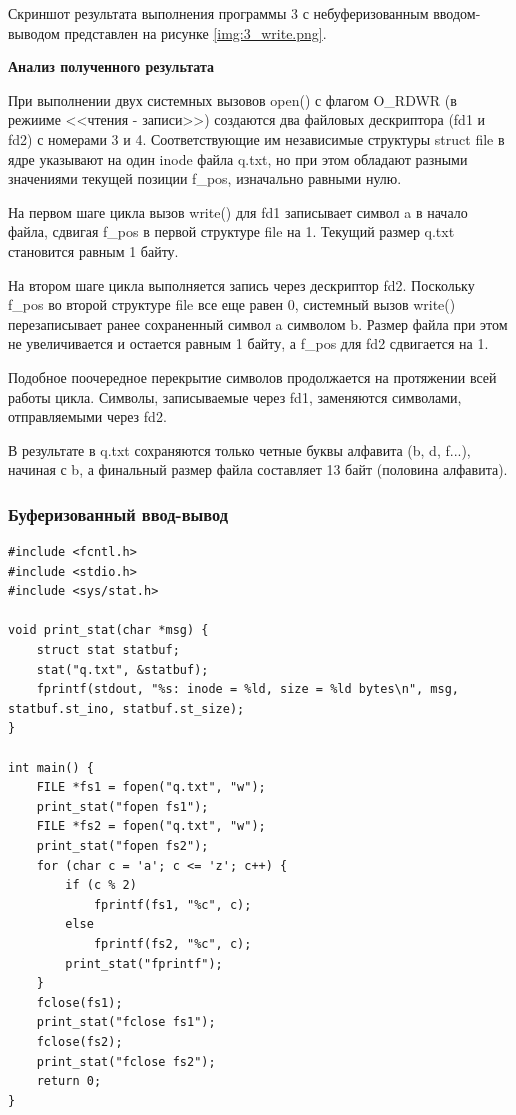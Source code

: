 Скриншот результата выполнения программы 3 с небуферизованным вводом-выводом представлен на рисунке \ref{img:3_write.png}.

\clearpage

\textbf{Анализ полученного результата}

При выполнении двух системных вызовов open() с флагом O\_RDWR (в режииме <<чтения - записи>>) создаются два файловых дескриптора (fd1 и fd2) с номерами 3 и 4. Соответствующие им независимые структуры struct file в ядре указывают на один inode файла q.txt, но при этом обладают разными значениями текущей позиции f\_pos, изначально равными нулю.

На первом шаге цикла вызов write() для fd1 записывает символ a в начало файла, сдвигая f\_pos в первой структуре file на 1. Текущий размер q.txt становится равным 1 байту.

На втором шаге цикла выполняется запись через дескриптор fd2. Поскольку f\_pos во второй структуре file все еще равен 0, системный вызов write() перезаписывает ранее сохраненный символ a символом b. Размер файла при этом не увеличивается и остается равным 1 байту, а f\_pos для fd2 сдвигается на 1.

Подобное поочередное перекрытие символов продолжается на протяжении всей работы цикла. Символы, записываемые через fd1, заменяются символами, отправляемыми через fd2.

В результате в q.txt сохраняются только четные буквы алфавита (b, d, f...), начиная с b, а финальный размер файла составляет 13 байт (половина алфавита).


\subsubsection{Буферизованный ввод-вывод}
\begin{lstlisting}[caption={Исходный код Программы 3 с буферизованным вводом-выводом}]
#include <fcntl.h>
#include <stdio.h>
#include <sys/stat.h>

void print_stat(char *msg) {
    struct stat statbuf;
    stat("q.txt", &statbuf);
    fprintf(stdout, "%s: inode = %ld, size = %ld bytes\n", msg, statbuf.st_ino, statbuf.st_size);
}

int main() {
    FILE *fs1 = fopen("q.txt", "w");
    print_stat("fopen fs1");
    FILE *fs2 = fopen("q.txt", "w");
    print_stat("fopen fs2");
    for (char c = 'a'; c <= 'z'; c++) {
        if (c % 2)
            fprintf(fs1, "%c", c);
        else
            fprintf(fs2, "%c", c);
        print_stat("fprintf");
    }
    fclose(fs1);
    print_stat("fclose fs1");
    fclose(fs2);
    print_stat("fclose fs2");
    return 0;
}
\end{lstlisting}

